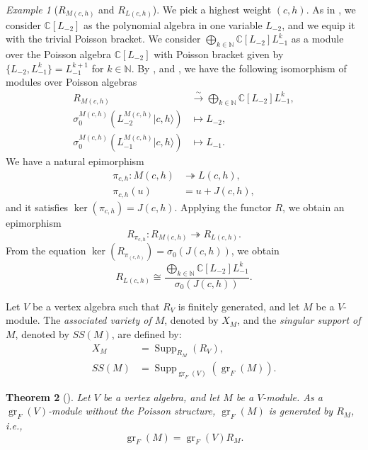 \documentclass[a4paper, 12pt, reqno]{amsart}
\newtheorem{theorem}{Theorem}[section]
\theoremstyle{remark}
\newtheorem{example}[theorem]{Example}
\DeclareMathOperator{\gr}{gr}
\DeclareMathOperator{\Supp}{Supp}
\begin{document}
\begin{example}[$R_{M(c, h)}$ and $R_{L(c, h)}$]
  \label{exa:21}
  We pick a highest weight $(c, h)$.
  As in , we consider $\mathbb{C}[L_{-2}]$ as the polynomial algebra in one variable $L_{-2}$, and we equip it with the trivial Poisson bracket.
  We consider $\bigoplus_{k \in \mathbb{N}}\mathbb{C}[L_{-2}]L_{-1}^k$ as a module over the Poisson algebra $\mathbb{C}[L_{-2}]$ with Poisson bracket given by $\{L_{-2}, L_{-1}^k\} = L_{-1}^{k + 1}$ for $k \in \mathbb{N}$.
  By ,  and , we have the following isomorphism of modules over Poisson algebras
  \begin{align*}
    R_{M(c, h)} &\xrightarrow{\sim} \bigoplus_{k \in \mathbb{N}}\mathbb{C}[L_{-2}]L_{-1}^k, \\
    \sigma^{M(c, h)}_0(L^{M(c, h)}_{-2}|c, h\rangle) &\mapsto L_{-2}, \\
    \sigma^{M(c, h)}_0(L^{M(c, h)}_{-1}|c, h\rangle) &\mapsto L_{-1}.
  \end{align*}
  We have a natural epimorphism
  \begin{align*}
    \pi_{c, h}: M(c, h) &\twoheadrightarrow L(c, h), \\
    \pi_{c, h}(u) &= u + J(c, h),
  \end{align*}
  and it satisfies $\ker(\pi_{c, h}) = J(c, h)$.
  Applying the functor $R$, we obtain an epimorphism
  \begin{equation*}
    R_{\pi_{c, h}}: R_{M(c, h)} \twoheadrightarrow R_{L(c, h)}.
  \end{equation*}
  From the equation $\ker(R_{\pi_{(c, h)}}) = \sigma_0(J(c, h))$, we obtain
  \begin{equation*}
    R_{L(c, h)} \cong \frac{\bigoplus_{k \in \mathbb{N}}\mathbb{C}[L_{-2}]L_{-1}^k}{\sigma_0(J(c, h))}.
  \end{equation*}
\end{example}

Let $V$ be a vertex algebra such that $R_V$ is finitely generated, and let $M$ be a $V$-module.
The \emph{associated variety of $M$}, denoted by $X_M$, and the \emph{singular support of $M$}, denoted by $SS(M)$, are defined by:
\begin{align*}
  X_M &= \Supp_{R_M}(R_V), \\
  SS(M) &= \Supp_{\gr_F(V)}(\gr_F(M)).
\end{align*}

\begin{theorem}[{\cite[Lemma 4.2]{li_abelianizing_2005}}]
  \label{thr:58}
  Let $V$ be a vertex algebra, and let $M$ be a $V$-module.
  As a $\gr_F(V)$-module without the Poisson structure, $\gr_F(M)$ is generated by $R_M$, i.e.,
  \begin{equation*}
    \gr_F(M) = \gr_F(V)R_M.
  \end{equation*}
\end{theorem}
\end{document}
